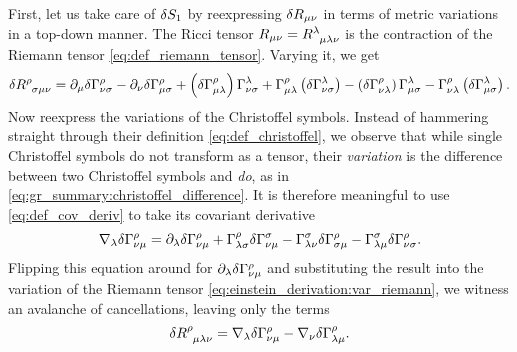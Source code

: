First, let us take care of $\delta S_1$ by reexpressing $\delta R_{\mu \nu}$ in terms of metric variations in a top-down manner.
The Ricci tensor $R_{\mu \nu} = R\indices{^\lambda_\mu_\lambda_\nu}$ is the contraction of the Riemann tensor \eqref{eq:def_riemann_tensor}.
Varying it, we get
\begin{equation}
	\variation{R\indices{^\rho_\sigma_\mu_\nu}} = \partial_\mu \variation{\Gamma^\rho_{\nu \sigma}}
	                                            - \partial_\nu \variation{\Gamma^\rho_{\mu \sigma}}
												+ \left(\variation{\Gamma^\rho_{\mu \lambda}}\right) \Gamma^\lambda_{\nu \sigma}
												+ \Gamma^\rho_{\mu \lambda} \left(\variation{\Gamma^\lambda_{\nu \sigma}\right)}
												- \left(\variation{\Gamma^\rho_{\nu \lambda}}\right) \Gamma^\lambda_{\mu \sigma}
												- \Gamma^\rho_{\nu \lambda} \left(\variation{\Gamma^\lambda_{\mu \sigma}\right)} .
	\label{eq:einstein_derivation:var_riemann}
\end{equation}
Now reexpress the variations of the Christoffel symbols.
Instead of hammering straight through their definition \eqref{eq:def_christoffel}, we observe that while single Christoffel symbols do not transform as a tensor, their \emph{variation} is the difference between two Christoffel symbols and \emph{do}, as in \cref{eq:gr_summary:christoffel_difference}.
It is therefore meaningful to use \cref{eq:def_cov_deriv} to take its covariant derivative
\begin{equation}
	\nabla_\lambda \delta \Gamma^\rho_{\nu \mu} = \partial_\lambda \delta \Gamma^\rho_{\nu \mu} 
	                                                 + \Gamma^\rho_{\lambda \sigma} \delta \Gamma{^\sigma_{\nu \mu}} 
	                                                 - \Gamma^\sigma_{\lambda \nu} \delta \Gamma{^\rho_{\sigma \mu}} 
	                                                 - \Gamma^\sigma_{\lambda \mu} \delta \Gamma{^\rho_{\nu \sigma}} .
	\label{eq:einstein_derivation:christoffel_cov_deriv}
\end{equation}
Flipping this equation around for $\partial_\lambda \delta \Gamma^\rho_{\nu \mu}$ and substituting the result into the variation of the Riemann tensor \eqref{eq:einstein_derivation:var_riemann}, we witness an avalanche of cancellations, leaving only the terms
\begin{equation}
	\variation{R\indices{^\rho_\mu_\lambda_\nu}} = \nabla_\lambda \variation{\Gamma^\rho_{\nu \mu}}
	                                             - \nabla_\nu \variation{\Gamma^\rho_{\lambda \mu}} .
\end{equation}
